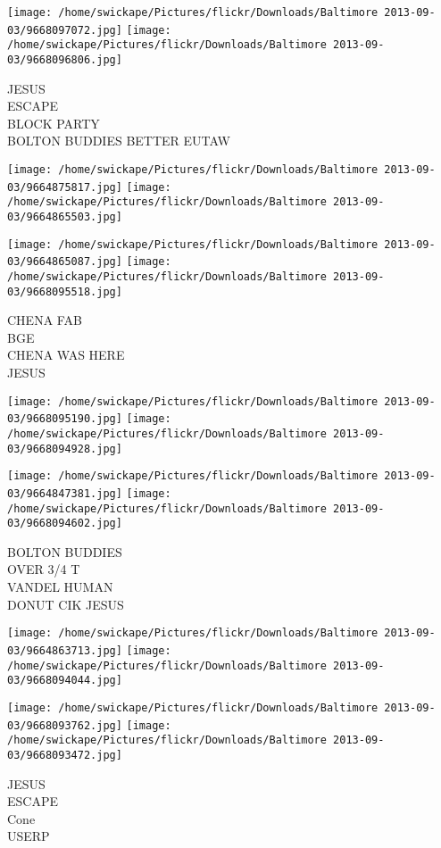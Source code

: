 \documentclass[10pt,letterpaper]{article}
\begin{document}
\texttt{[image: /home/swickape/Pictures/flickr/Downloads/Baltimore 2013-09-03/9668097072.jpg]}
\texttt{[image: /home/swickape/Pictures/flickr/Downloads/Baltimore 2013-09-03/9668096806.jpg]}

JESUS\\
ESCAPE\\
BLOCK PARTY\\
BOLTON BUDDIES BETTER EUTAW
\pagebreak

\texttt{[image: /home/swickape/Pictures/flickr/Downloads/Baltimore 2013-09-03/9664875817.jpg]}
\texttt{[image: /home/swickape/Pictures/flickr/Downloads/Baltimore 2013-09-03/9664865503.jpg]}

\texttt{[image: /home/swickape/Pictures/flickr/Downloads/Baltimore 2013-09-03/9664865087.jpg]}
\texttt{[image: /home/swickape/Pictures/flickr/Downloads/Baltimore 2013-09-03/9668095518.jpg]}

CHENA FAB\\
BGE\\
CHENA WAS HERE\\
JESUS
\pagebreak

\texttt{[image: /home/swickape/Pictures/flickr/Downloads/Baltimore 2013-09-03/9668095190.jpg]}
\texttt{[image: /home/swickape/Pictures/flickr/Downloads/Baltimore 2013-09-03/9668094928.jpg]}

\texttt{[image: /home/swickape/Pictures/flickr/Downloads/Baltimore 2013-09-03/9664847381.jpg]}
\texttt{[image: /home/swickape/Pictures/flickr/Downloads/Baltimore 2013-09-03/9668094602.jpg]}

BOLTON BUDDIES\\
OVER 3/4 T\\
VANDEL HUMAN\\
DONUT CIK JESUS
\pagebreak

\texttt{[image: /home/swickape/Pictures/flickr/Downloads/Baltimore 2013-09-03/9664863713.jpg]}
\texttt{[image: /home/swickape/Pictures/flickr/Downloads/Baltimore 2013-09-03/9668094044.jpg]}

\texttt{[image: /home/swickape/Pictures/flickr/Downloads/Baltimore 2013-09-03/9668093762.jpg]}
\texttt{[image: /home/swickape/Pictures/flickr/Downloads/Baltimore 2013-09-03/9668093472.jpg]}

JESUS\\
ESCAPE\\
Cone\\
USERP
\pagebreak
\end{document}
